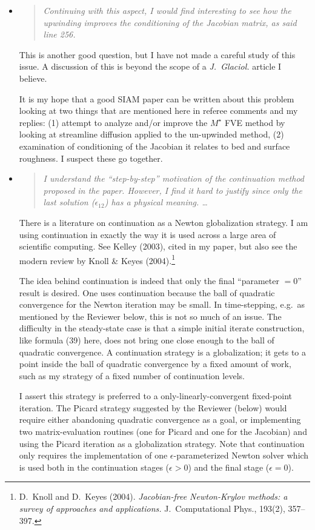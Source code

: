 \documentclass[11pt,reqno]{amsart}
\newcommand{\reply}[2]{
\medskip\medskip
\item  \begin{quote}
\emph{#1}
\end{quote}

\medskip
\noindent #2}
\begin{document}
\begin{itemize}
\reply{Continuing with this aspect, I would find interesting to see how the upwinding improves the conditioning of the Jacobian matrix, as said line 256.}
{This is another good question, but I have not made a careful study of this issue.  A discussion of this is beyond the scope of a \emph{J.~Glaciol.} article I believe.  

It is my hope that a good SIAM paper can be written about this problem looking at two things that are mentioned here in referee comments and my replies: (1) attempt to analyze and/or improve the $M^\star$ FVE method by looking at streamline diffusion applied to the un-upwinded method, (2) examination of conditioning of the Jacobian it relates to bed and surface roughness.  I suspect these go together.}

\reply{I understand the ``step-by-step'' motivation of the continuation method proposed
in the paper.  However, I find it hard to justify since only the last solution ($\epsilon_{12}$)
has a physical meaning. \dots}
{There is a literature on continuation as a Newton globalization strategy.  I am using continuation in exactly the way it is used across a large area of scientific computing.  See Kelley (2003), cited in my paper, but also see the modern review by Knoll \& Keyes (2004).\footnote{D.~Knoll and D.~Keyes (2004). \emph{Jacobian-free Newton-Krylov methods: a survey of approaches and applications.} J.~Computational Phys., 193(2), 357--397.}

The idea behind continuation is indeed that only the final ``parameter $=0$'' result is desired.  One uses continuation because the ball of quadratic convergence for the Newton iteration may be small.  In time-stepping, e.g.~as mentioned by the Reviewer below, this is not so much of an issue.  The difficulty in the steady-state case is that a simple initial iterate construction, like formula (39) here, does not bring one close enough to the ball of quadratic convergence.  A continuation strategy is a globalization; it gets to a point inside the ball of quadratic convergence by a fixed amount of work, such as my strategy of a fixed number of continuation levels.

I assert this strategy is preferred to a only-linearly-convergent fixed-point iteration.  The Picard strategy suggested by the Reviewer (below) would require either abandoning quadratic convergence as a goal, or implementing two matrix-evaluation routines (one for Picard and one for the Jacobian) and using the Picard iteration as a globalization strategy.  Note that continuation only requires the implementation of one $\epsilon$-parameterized Newton solver which is used both in the continuation stages ($\epsilon>0$) and the final stage ($\epsilon=0$).}


\end{itemize}
\end{document}
